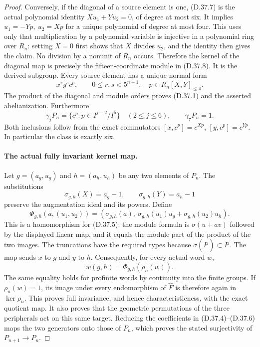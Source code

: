 \begin{proof}
Conversely, if the diagonal of a source element is one,
\textup{(D.37.7)} is the actual polynomial identity
\(Xu_1+Yu_2=0\), of degree at most six.
It implies \(u_1=-Yp,\ u_2=Xp\) for a unique polynomial
of degree at most four.  This uses only that multiplication
by a polynomial variable is injective in a polynomial
ring over \(R_n\): setting \(X=0\) first shows that
\(X\) divides \(u_2\), and the identity then gives the
claim.  No division by a nonunit of \(R_n\) occurs.
Therefore the kernel of the diagonal map is precisely
the fifteen-coordinate module in \textup{(D.37.8)}.
It is the derived subgroup.  Every source element has
a unique normal form
\[
 x^r y^s c^p,\qquad
 0\leq r,s<5^{n+1},\quad
 p\in R_n[X,Y]_{\leq4}.
 \tag{D.37.9}
\]
The product of the diagonal and module orders proves
\textup{(D.37.1)} and the asserted abelianization.
Furthermore
\[
 \gamma_jP_n
     =\{c^p:p\in I^{j-2}/I^5\}
       \quad(2\leq j\leq6),\qquad
 \gamma_7P_n=1.
 \tag{D.37.10}
\]
Both inclusions follow from the exact commutators
\([x,c^p]=c^{Xp}\), \([y,c^p]=c^{Yp}\).
In particular the class is exactly six.

\paragraph{The actual fully invariant kernel map.}
Let \(g=(a_g,u_g)\) and \(h=(a_h,u_h)\) be any two elements
of \(P_n\).  The substitutions
\[
 \sigma_{g,h}(X)=a_g-1,\qquad
 \sigma_{g,h}(Y)=a_h-1
 \tag{D.37.11}
\]
preserve the augmentation ideal and its powers.
Define
\[
 \Phi_{g,h}(a,(u_1,u_2))
    =\left(\sigma_{g,h}(a),\
      \sigma_{g,h}(u_1)u_g+
      \sigma_{g,h}(u_2)u_h\right).
 \tag{D.37.12}
\]
This is a homomorphism for
\textup{(D.37.5)}: the module formula is
\(\sigma(u+av)\) followed by the displayed linear
map, and it equals the module part of the product
of the two images.  The truncations have the
required types because \(\sigma(I^j)\subset I^j\).
The map sends \(x\) to \(g\) and \(y\) to \(h\).
Consequently, for every actual word \(w\),
\[
                  w(g,h)
                      =\Phi_{g,h}(\rho_n(w)).
 \tag{D.37.13}
\]
The same equality holds for profinite words by
continuity into the finite groups.
If \(\rho_n(w)=1\), its image under every endomorphism
of \(\widehat F\) is therefore again in
\(\ker\rho_n\).
This proves full invariance, and hence characteristicness,
with the exact quotient map.  It also proves that
the geometric permutations of the three peripherals
act on this same target.  Reducing the coefficients
in \textup{(D.37.4)--(D.37.6)} maps the two generators
onto those of \(P_n\), which proves the stated
surjectivity of \(P_{n+1}\to P_n\).


\end{proof}
